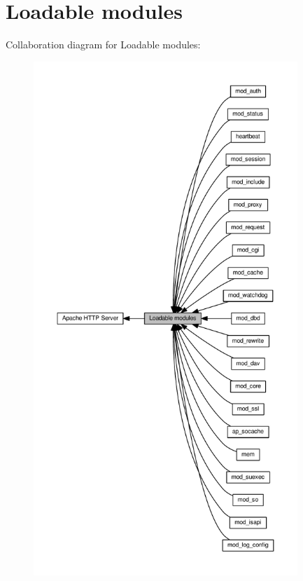 \hypertarget{group__APACHE__MODS}{}\section{Loadable modules}
\label{group__APACHE__MODS}
Collaboration diagram for Loadable modules\+:
\nopagebreak
\begin{figure}[H]
\begin{center}
\leavevmode
\includegraphics[height=550pt]{group__APACHE__MODS}
\end{center}
\end{figure}
